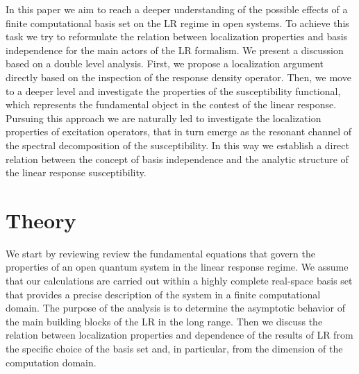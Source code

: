 \documentclass[reprint,aps,prb]{revtex4-1}
\begin{document}
In this paper we aim to reach a deeper understanding of the possible effects of a finite computational basis set on the LR regime in open systems. To achieve this task we try to
reformulate the relation between localization properties and basis independence for the main actors of the LR formalism. We present a discussion based on a double level analysis. First, 
we propose a localization argument directly based on the inspection of the response density operator. Then, we move to a deeper level and investigate the properties of the susceptibility 
functional, which represents the fundamental object in the contest of the linear response. Pursuing this approach we are naturally led to investigate the localization properties of excitation 
operators, that in turn emerge as the resonant channel of the spectral decomposition of the susceptibility. In this way we establish a direct relation between the concept of basis independence 
and the analytic structure of the linear response susceptibility.


\section{Theory}

We start by reviewing review the fundamental equations that govern the properties of an open quantum system in the linear response regime. We assume that our calculations are carried 
out within a highly complete real-space basis set that provides a precise description of the system in a finite computational domain. The purpose of the analysis is to determine the 
asymptotic behavior of the main building blocks of the LR in the long range. Then we discuss the relation between localization properties and dependence of the results of LR from the 
specific choice of the basis set and, in particular, from the dimension of the computation  domain. 
\end{document}
